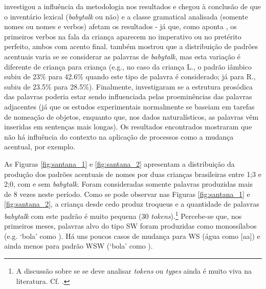 \documentclass[output=paper]{LSP/langsci}
\begin{document}
\citet{baia2008} investigou a influência da metodologia nos resultados e chegou à conclusão de que o inventário lexical (\textit{babytalk} ou não) e a classe gramatical analisada (somente nomes ou nomes e verbos) afetam os resultados - já que, como aponta \citet{santos2001}, os primeiros verbos na fala da criança aparecem no imperativo ou no pretérito perfeito, ambos com acento final. \citet{santos2007} também mostrou que a distribuição de padrões acentuais varia se se considerar as palavras de \textit{babytalk}, mas esta variação é diferente de criança para criança (e.g., no caso da criança L., o padrão iâmbico subiu de 23\% para 42.6\% quando este tipo de palavra é considerado; já para R., subiu de 23.5\% para 28.5\%). Finalmente, \citet{santosfikkert2007} investigaram se a estrutura prosódica das palavras poderia estar sendo influenciada pelas proeminências das palavras adjacentes (já que os estudos experimentais normalmente se baseiam em tarefas de nomeação de objetos, enquanto que, nos dados naturalísticos, as palavras vêm inseridas em sentenças mais longas). Os resultados encontrados mostraram que não há influência do contexto na aplicação de processos como a mudança acentual, por exemplo.

As Figuras \ref{fig:santana_1} e \ref{fig:santana_2} apresentam a distribuição da produção dos padrões acentuais de nomes por duas crianças brasileiras entre 1;3 e 2;0, com e sem \textit{babytalk}. Foram consideradas somente palavras produzidas mais de 8 vezes neste período. Como se pode observar nas Figuras \ref{fig:santana_1} e \ref{fig:santana_2}, a criança desde cedo produz troqueus e a quantidade de palavras \textit{babytalk} com este padrão é muito pequena (30 \textit{tokens}).\footnote{A discussão sobre se se deve analisar \textit{tokens} ou \textit{types} ainda é muito viva na literatura. Cf. \citealt{vigario_etal2010}.} Percebe-se que, nos primeiros meses, palavras alvo do tipo SW foram produzidas como monossílabos (e.g. `bola' como \ipa{[bo]}). Há uns poucos casos de mudança para WS (água como [a\pstr a]) e ainda menos para padrão WSW (`bola' como ).
\end{document}
